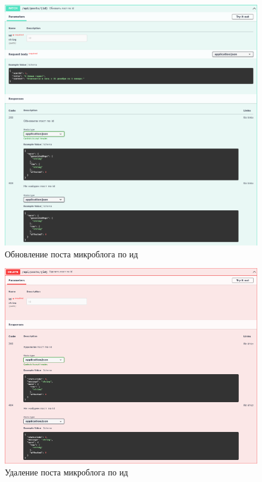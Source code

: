 \documentclass[12pt, a4paper, simple]{eskdtext}
\begin{document}
  \begin{figure}[p!h]
    \centering
    \includegraphics[width=14cm]
    {images/SwaggerUi/2023-02-25_18-10-24.png}
    \caption{Обновление поста микроблога по ид}
    \label{fig:more_5}
  \end{figure}

  \begin{figure}[p!h]
    \centering
    \includegraphics[width=14cm]
    {images/SwaggerUi/2023-02-25_18-10-57.png}
    \caption{Удаление поста микроблога по ид}
    \label{fig:more_6}
  \end{figure}
\end{document}
